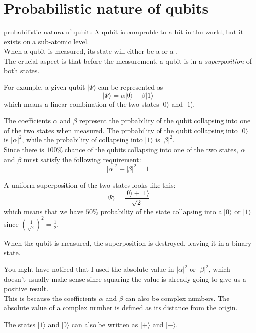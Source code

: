\documentclass[preview]{standalone}
\begin{document}
\genpage

\section{Probabilistic nature of qubits}

\begin{snippet}{probabilistic-natura-of-qubits}
    A qubit is comprable to a bit in the  world, but it exists on a sub-atomic level. \\
    When a qubit is measured, its state will either be a  or a . \\
    The crucial aspect is that before the measurement, a qubit is in a \textit{superposition} of both states.
    
    For example, a given qubit \(|\Psi\rangle\) can be represented as
    \[
        |\Psi\rangle=\alpha |0\rangle+\beta |1\rangle
    \]
    which means a linear combination of the two states \(|0\rangle\) and \(|1\rangle\).
    
    The coefficients \(\alpha\) and \(\beta\) represent the probability of the qubit collapsing into one of the two states when measured.
    The probability of the qubit collapsing into \(|0\rangle\) is \(|\alpha|^2\),
    while the probability of collapsing into \(|1\rangle\) is \(|\beta|^2\). \\
    Since there is \(100\%\) chance of the qubits collapsing into one of the two states, \(\alpha\) and \(\beta\) must satisfy the following requirement:
    \[
        |\alpha|^2+|\beta|^2=1
    \]
    
    A uniform superposition of the two states looks like this:
    \[
        |\Psi\rangle=\frac{|0\rangle+|1\rangle}{\sqrt{2}}
    \]
    which means that we have \(50\%\) probability of the state collapsing into a \(|0\rangle\) or \(|1\rangle\)
    since \({\left(\frac{1}{\sqrt{2}}\right)}^2=\frac{1}{2}\).
    
    When the qubit is measured, the superposition is destroyed, leaving it in a  binary state.
    
    You mght have noticed that I used the absolute value in \(|\alpha|^2\) or \(|\beta|^2\), which doesn't usually make sense since squaring the value is already going to give us a positive result.
    \\
    This is because the coefficients \(\alpha\) and \(\beta\) can also be complex numbers. The absolute value of a complex number is defined as its distance from the origin.
    
    The states \(|1\rangle\) and \(|0\rangle\) can also be written as \(|+\rangle\) and \(|-\rangle\).
\end{snippet}
\end{document}
